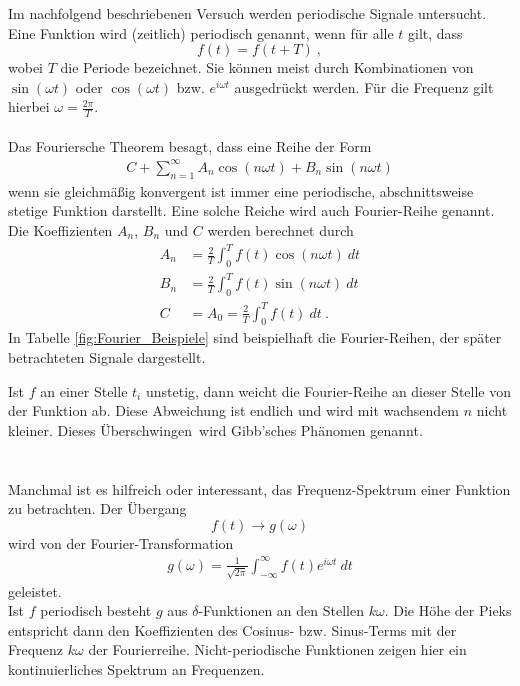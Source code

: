 Im nachfolgend beschriebenen Versuch werden periodische Signale untersucht. \\
Eine Funktion wird (zeitlich) periodisch genannt, wenn für alle $t$ gilt, dass
\[ f(t) = f(t+T) \ , \]
wobei $T$ die Periode bezeichnet. Sie können meist durch Kombinationen von $\sin(\omega t)$ oder $\cos(\omega t)$ bzw. $e^{i\omega t}$ ausgedrückt werden. Für die Frequenz gilt hierbei $\omega = \frac{2\pi}{T} $. \\
\ \\
Das Fouriersche Theorem besagt, dass eine Reihe der Form
\begin{align}
	C + \sum_{n = 1}^{\infty} A_n\cos(n\omega t)+B_n\sin(n\omega t)
\end{align}
wenn sie gleichmäßig konvergent ist immer eine periodische, abschnittsweise stetige Funktion darstellt. Eine solche Reiche wird auch Fourier-Reihe genannt. Die Koeffizienten $A_n$, $B_n$ und $C$ werden berechnet durch
\begin{align}
	A_n &= \frac{2}{T}\int_0^T f(t)\cos(n\omega t)\ dt \\
	B_n &= \frac{2}{T}\int_0^T f(t)\sin(n\omega t)\ dt \\
	C &= A_0 = \frac{2}{T}\int_0^Tf(t)\ dt \ .
\end{align}
In Tabelle \ref{fig:Fourier_Beispiele} sind beispielhaft die Fourier-Reihen, der später betrachteten Signale dargestellt.

Ist $f$ an einer Stelle $t_i$ unstetig, dann weicht die Fourier-Reihe an dieser Stelle von der Funktion ab. Diese Abweichung ist endlich und wird mit wachsendem $n$ nicht kleiner. Dieses \glqq Überschwingen\grqq\ wird Gibb'sches Phänomen genannt. \\
\ \\
\ \\
Manchmal ist es hilfreich oder interessant, das Frequenz-Spektrum einer Funktion zu betrachten. Der Übergang
\[ f(t)\rightarrow g(\omega) \]
wird von der Fourier-Transformation
\begin{align}
	g(\omega) = \frac{1}{\sqrt{2\pi}}\int_{-\infty}^{\infty}f(t)e^{i\omega t}\ dt
\end{align}
geleistet. \\
Ist $f$ periodisch besteht $g$ aus $\delta$-Funktionen an den Stellen $k\omega$. Die Höhe der Pieks entspricht dann den Koeffizienten des Cosinus- bzw. Sinus-Terms mit der Frequenz $k\omega$ der Fourierreihe. Nicht-periodische Funktionen zeigen hier ein kontinuierliches Spektrum an Frequenzen.